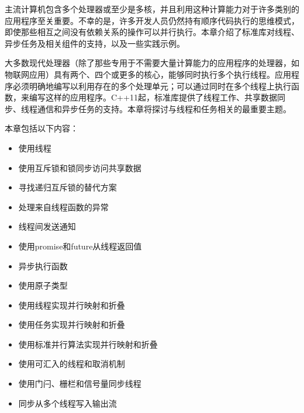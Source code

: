 主流计算机包含多个处理器或至少是多核，并且利用这种计算能力对于许多类别的应用程序至关重要。不幸的是，许多开发人员仍然持有顺序代码执行的思维模式，即使那些相互之间没有依赖关系的操作可以并行执行。本章介绍了标准库对线程、异步任务及相关组件的支持，以及一些实践示例。

大多数现代处理器（除了那些专用于不需要大量计算能力的应用程序的处理器，如物联网应用）具有两个、四个或更多的核心，能够同时执行多个执行线程。应用程序必须明确地编写以利用存在的多个处理单元；可以通过同时在多个线程上执行函数，来编写这样的应用程序。C++11起，标准库提供了线程工作、共享数据同步、线程通信和异步任务的支持。本章将探讨与线程和任务相关的最重要主题。

本章包括以下内容：

\begin{itemize}
\item
使用线程

\item
使用互斥锁和锁同步访问共享数据

\item
寻找递归互斥锁的替代方案

\item
处理来自线程函数的异常

\item
线程间发送通知

\item
使用promise和future从线程返回值

\item
异步执行函数

\item
使用原子类型

\item
使用线程实现并行映射和折叠

\item
使用任务实现并行映射和折叠

\item
使用标准并行算法实现并行映射和折叠

\item
使用可汇入的线程和取消机制

\item
使用门闩、栅栏和信号量同步线程

\item
同步从多个线程写入输出流
\end{itemize}
